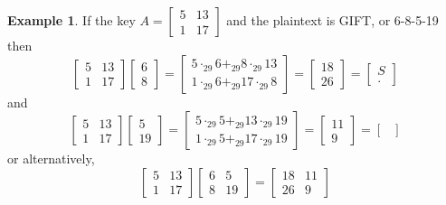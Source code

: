 \documentclass[11pt]{article}
\theoremstyle{definition}\newtheorem{definition}{Definition}
\theoremstyle{definition}\newtheorem{example}{Example}
\theoremstyle{definition}\newtheorem{samplecode}{Sample Code}
\begin{document}
\begin{example}
    If the key $A = \begin{bmatrix} 5 & 13 \\ 1 & 17 \end{bmatrix}$ and the plaintext is GIFT, or 6-8-5-19 then
    \begin{equation*}
        \begin{bmatrix} 5 & 13 \\ 1 & 17 \end{bmatrix} \begin{bmatrix} 6 \\ 8 \end{bmatrix} = \begin{bmatrix} 5 \cdot_{29} 6 +_{29} 8 \cdot_{29} 13 \\ 1 \cdot_{29} 6 +_{29} 17 \cdot_{29} 8\end{bmatrix} = \begin{bmatrix} 18 \\ 26 \end{bmatrix} = \begin{bmatrix} S \\ . \end{bmatrix}
    \end{equation*}
    and
    \begin{equation*}
        \begin{bmatrix} 5 & 13 \\ 1 & 17 \end{bmatrix} \begin{bmatrix} 5 \\ 19 \end{bmatrix} = \begin{bmatrix} 5 \cdot_{29} 5 +_{29} 13 \cdot_{29} 19 \\ 1 \cdot_{29} 5 +_{29} 17 \cdot_{29} 19 \end{bmatrix} = \begin{bmatrix} 11 \\ 9 \end{bmatrix} = \begin{bmatrix}  \end{bmatrix}
    \end{equation*}
    or alternatively,
    \begin{equation*}
        \begin{bmatrix} 5 & 13 \\ 1 & 17 \end{bmatrix}\begin{bmatrix} 6 & 5 \\ 8 & 19 \end{bmatrix} = \begin{bmatrix} 18 & 11 \\ 26 & 9 \end{bmatrix}
    \end{equation*}
\end{example}
\end{document}
